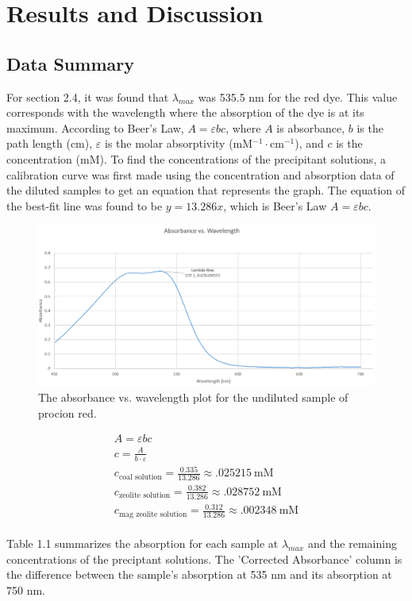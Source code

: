 \documentclass[11pt]{article} %
\begin{document}
\section{Results and Discussion}

\subsection{Data Summary}
For section 2.4, it was found that $\lambda_{max}$ was 535.5 nm for the red dye. This value corresponds with the wavelength where the absorption of the dye is at its maximum. According to Beer's Law, $A = \varepsilon b c$, where $A$ is absorbance, $b$ is the path length (cm), $\varepsilon$ is the molar absorptivity (mM$^{-1} \cdot$cm$^{-1}$), and $c$ is the concentration (mM). To find the concentrations of the precipitant solutions, a calibration curve was first made using the concentration and absorption data of the diluted samples to get an equation that represents the graph. The equation of the best-fit line was found to be $y = 13.286x$, which is Beer's Law $A = \varepsilon b c$. 

\begin{figure}[H]
    \centering
    \includegraphics[width=\linewidth]{spectra_graph}
    \caption{The absorbance vs. wavelength plot for the undiluted sample of procion red.}
    \label{fig:mesh1}
\end{figure}

\begin{align*}
A = \varepsilon bc \\
c = \frac{A}{b\cdot \varepsilon} \\
c_{\text{coal solution}} = \frac{0.335}{13.286} \approx .025215 \ \text{mM} \\
c_{\text{zeolite solution}} = \frac{0.382}{13.286} \approx .028752 \ \text{mM}\\
c_{\text{mag zeolite solution}} = \frac{0.312}{13.286} \approx .002348 \ \text{mM}
\end{align*}
\\
Table 1.1 summarizes the absorption for each sample at $\lambda_{max}$ and the remaining concentrations of the preciptant solutions. The 'Corrected Absorbance' column is the difference between the sample's absorption at 535 nm and its absorption at 750 nm.
\end{document}
